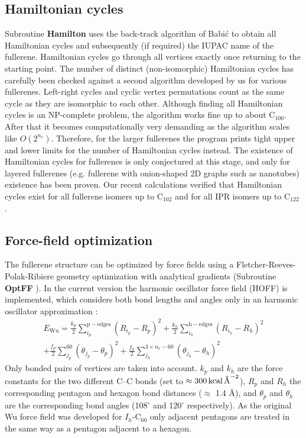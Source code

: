 \documentclass[article,a4paper,twoside]{memoir}
\newcommand{\C}[1]{\ensuremath{\mathrm{C}_{#1}}}
\newcommand{\funname}[1]{{\color{blue}\textbf{#1}}}
\begin{document}
\subsection{Hamiltonian cycles}
Subroutine \funname{Hamilton} uses the back-track algorithm of Babi\'c \cite{Babic1995a} to obtain all 
Hamiltonian cycles and subsequently (if required) the IUPAC name of the fullerene. Hamiltonian cycles go through all vertices exactly once returning 
to the starting point. The number of distinct (non-isomorphic) Hamiltonian cycles has carefully been checked 
against a second algorithm developed by us for various fullerenes. Left-right cycles and cyclic vertex permutations count as the 
same cycle as they are isomorphic to each other. Although finding all Hamiltonian cycles is an NP-complete problem, the algorithm works fine up to about \C{100}. 
After that it becomes computationally very demanding as the algorithm scales like $O(2^{n_v})$. Therefore, for the larger fullerenes the program prints 
tight upper and lower limits for the number of Hamiltonian cycles instead. The existence of Hamiltonian cycles for fullerenes is only conjectured at this 
stage, and only for layered fullerenes (e.g. fullerene with onion-shaped 2D graphs such as nanotubes) existence has been proven. Our recent calculations verified that
Hamiltonian cycles exist for all fullerene isomers up to \C{102} and for all IPR isomers up to \C{122} \cite{PSAJDB}.

\subsection{Force-field optimization}
The fullerene structure can be optimized by force fields using a Fletcher-Reeves-Polak-Ribiere geometry optimization \cite{NumRec}
with analytical gradients (Subroutine \funname{OptFF} \cite{NumericalRecipes}). In the current version the harmonic oscillator
force field (HOFF) is implemented, which considers both bond lengths and angles only in an harmonic oscillator approximation \cite{Wu87}: 
\begin{multline}
  \label{eq:Ewu}
  E_{\mathrm{Wu}} = 
          \frac{k_p}{2} \sum_{i_p}^{\mathrm{p-edges}} \left(R_{i_p} - R_p\right)^2 
        + \frac{k_h}{2} \sum_{i_h}^{\mathrm{h-edges}} \left(R_{i_h} - R_h\right)^2 \\
        + \frac{f_p}{2} \sum_{j_p}^{60} \left(\theta_{j_p} - \theta_p\right)^2 
        + \frac{f_h}{2} \sum_{j_h}^{3\times n_v-60} \left(\theta_{j_h} - \theta_h\right)^2 
\end{multline}
Only bonded pairs of vertices are taken into account. $k_{p}$ and $k_{h}$ are
the force constants for the two different C--C bonds (set to $\approx 300 \text{\,kcal\,\AA}^{-2}$), $R_p$ and $R_h$ the corresponding pentagon and
hexagon bond distances ($\approx$ 1.4 \AA), and $\theta_p $ and $\theta_h$ are the corresponding bond angles (108$^\circ$ and 120$^\circ$
respectively). As the original Wu force field was developed for $I_h$-\C{60} only adjacent pentagons are treated in the same way as a pentagon adjacent to a hexagon.
\end{document}
